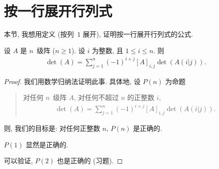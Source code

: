 \section{按一行展开行列式}

本节, 我想用定义 (按列~\(1\) 展开),
证明按一行展开行列式的公式.

\begin{theorem}
    设 \(A\) 是 \(n\)~级阵 (\(n \geq 1\)).
    设 \(i\) 为整数, 且 \(1 \leq i \leq n\).
    则
    \begin{align*}
        \det {(A)} = \sum_{j = 1}^{n}
        {(-1)^{i+j} [A]_{i,j} \det {(A(i|j))}}.
    \end{align*}
\end{theorem}

\begin{proof}
    我们用数学归纳法证明此事.
    具体地, 设 \(P(n)\) 为命题
    \begin{quotation}
        对任何 \(n\)~级阵 \(A\),
        对任何不超过 \(n\) 的正整数 \(i\),
        \begin{align*}
            \det {(A)} = \sum_{j = 1}^{n}
            {(-1)^{i+j} [A]_{i,j} \det {(A(i|j))}}.
        \end{align*}
    \end{quotation}
    则, 我们的目标是:
    对任何正整数 \(n\), \(P(n)\) 是正确的.

    \(P(1)\) 显然是正确的.

    可以验证, \(P(2)\) 也是正确的 (习题).


\end{proof}
